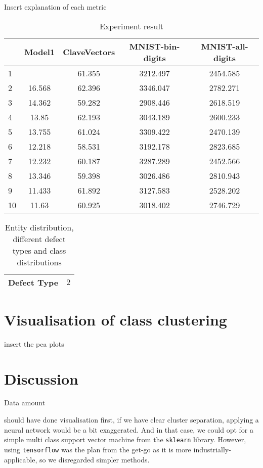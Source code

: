 Insert explanation of each metric
\begin{table}[H]
	\centering
\begin{tabular}{|lcccc|}
	\hline
	\backslashbox{run \#}{Metrics}
&{Model1}&{ClaveVectors}&{MNIST-bin-digits}&{MNIST-all-digits} \\\hline\hline
	1 &  & 61.355 & 3212.497 & 2454.585 \\ \hline
	2 & 16.568 & 62.396 & 3346.047 & 2782.271 \\ \hline
	3 & 14.362 & 59.282 & 2908.446 & 2618.519 \\ \hline
	4 & 13.85 & 62.193 & 3043.189 &  2600.233 \\ \hline
	5 & 13.755 & 61.024 & 3309.422 & 2470.139 \\ \hline
	6 & 12.218 & 58.531 & 3192.178 & 2823.685 \\ \hline
	7 & 12.232 & 60.187 & 3287.289 & 2452.566 \\ \hline
	8 & 13.346 & 59.398 & 3026.486 & 2810.943 \\ \hline
	9 & 11.433 & 61.892 & 3127.583 & 2528.202 \\ \hline
	10 & 11.63 & 60.925 & 3018.402 & 2746.729 \\ \hline
\end{tabular}
	\caption{Experiment result}
\end{table}


\begin{table}[H]
	\centering
	\begin{tabular}{|c|c|} \hline
		\textbf{Defect Type} & $2$ \\ \hline
	\end{tabular}
	\caption{Entity distribution, different defect types and class distributions}
\end{table}


\section{Visualisation of class clustering}
insert the pca plots

\section{Discussion}
Data amount

should have done visualisation first, if we have clear cluster separation, applying a neural network would be a bit exaggerated. And in that case, we could opt for a simple multi class support vector machine from the \verb|sklearn| library. However, using \verb|tensorflow| was the plan from the get-go as it is more industrially-applicable, so we disregarded simpler methods.



